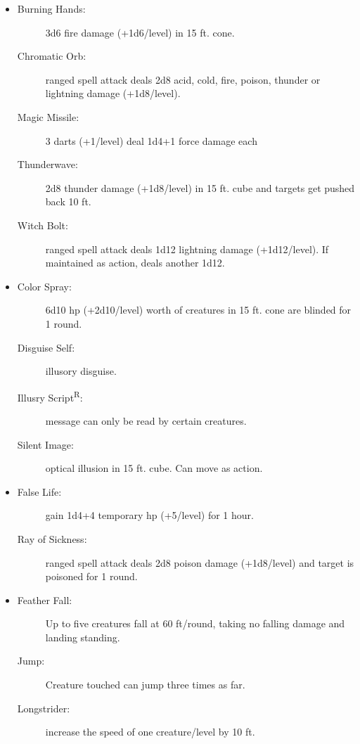 \documentclass[DIV=14, paper=a4, fontsize=10pt, twocolumn, twoside]{scrartcl}
\begin{document}
\begin{itemize}[align=parleft,labelwidth=1cm]
\begin{description}
	\end{description}
	\renewcommand{\labelitemi}{Evoc}\item
	\begin{description}
\item[Burning Hands:] 3d6 fire damage (+1d6/level) in 15 ft. cone.
\item[Chromatic Orb:] ranged spell attack deals 2d8 acid, cold, fire, poison, thunder or lightning damage (+1d8/level).
\item[Magic Missile:] 3 darts (+1/level) deal 1d4+1 force damage each
\item[Thunderwave:] 2d8 thunder damage (+1d8/level) in 15 ft. cube and targets get pushed back 10 ft.
\item[Witch Bolt:] ranged spell attack deals 1d12 lightning damage (+1d12/level). If maintained as action, deals another 1d12.
	\end{description}
	\renewcommand{\labelitemi}{Illus}\item
	\begin{description}
\item[Color Spray:] 6d10 hp (+2d10/level) worth of creatures in 15 ft.
cone are blinded for 1 round.
\item[Disguise Self:] illusory disguise.
\item[Illusry Script\textsuperscript{R}:] message can only be read by certain creatures.
\item[Silent Image:] optical illusion in 15 ft. cube. Can move as action.	
	\end{description}
	\renewcommand{\labelitemi}{Necro}\item
	\begin{description}
\item[False Life:] gain 1d4+4 temporary hp (+5/level) for 1 hour.
\item[Ray of Sickness:] ranged spell attack deals 2d8 poison damage (+1d8/level) and target is poisoned for 1 round.
	\end{description}
	\renewcommand{\labelitemi}{Trans}\item
	\begin{description}
\item[Feather Fall:] Up to five creatures fall at 60 ft/round, taking no falling damage and landing standing.
\item[Jump:] Creature touched can jump three times as far.
\item[Longstrider:] increase the speed of one creature/level by 10 ft.
	\end{description}
\end{itemize}
\end{document}
